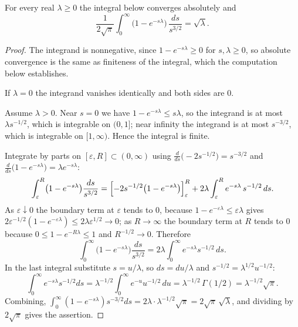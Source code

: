 \begin{lemma}
For every real $\lambda \geq 0$ the integral below converges absolutely and
\[
  \frac{1}{2\sqrt{\pi}} \int_0^\infty \bigl(1 - e^{-s\lambda}\bigr)
      \, \frac{ds}{s^{3/2}}
    = \sqrt{\lambda} .
\]
\end{lemma}
\begin{proof}
The integrand is nonnegative, since $1 - e^{-s\lambda} \geq 0$ for
$s, \lambda \geq 0$, so absolute convergence is the same as finiteness of the
integral, which the computation below establishes.

If $\lambda = 0$ the integrand vanishes identically and both sides are $0$.

Assume $\lambda > 0$.  Near $s = 0$ we have $1 - e^{-s\lambda} \leq s\lambda$, so
the integrand is at most $\lambda s^{-1/2}$, which is integrable on $(0,1]$; near
infinity the integrand is at most $s^{-3/2}$, which is integrable on
$[1,\infty)$.  Hence the integral is finite.

Integrate by parts on $[\varepsilon, R] \subset (0,\infty)$ using
$\frac{d}{ds}\bigl(-2 s^{-1/2}\bigr) = s^{-3/2}$ and
$\frac{d}{ds}\bigl(1-e^{-s\lambda}\bigr) = \lambda e^{-s\lambda}$:
\[
  \int_\varepsilon^R \bigl(1-e^{-s\lambda}\bigr)\frac{ds}{s^{3/2}}
   = \Bigl[-2s^{-1/2}\bigl(1-e^{-s\lambda}\bigr)\Bigr]_\varepsilon^R
     + 2\lambda\int_\varepsilon^R e^{-s\lambda}\, s^{-1/2}\, ds .
\]
As $\varepsilon \downarrow 0$ the boundary term at $\varepsilon$ tends to $0$,
because $1 - e^{-\varepsilon\lambda} \leq \varepsilon\lambda$ gives
$2\varepsilon^{-1/2}(1-e^{-\varepsilon\lambda}) \leq 2\lambda\varepsilon^{1/2} \to 0$;
as $R \to \infty$ the boundary term at $R$ tends to $0$ because
$0 \leq 1 - e^{-R\lambda} \leq 1$ and $R^{-1/2}\to0$.  Therefore
\[
  \int_0^\infty \bigl(1-e^{-s\lambda}\bigr)\frac{ds}{s^{3/2}}
    = 2\lambda \int_0^\infty e^{-s\lambda} s^{-1/2}\, ds .
\]
In the last integral substitute $s = u/\lambda$, so $ds = du/\lambda$ and
$s^{-1/2} = \lambda^{1/2}u^{-1/2}$:
\[
  \int_0^\infty e^{-s\lambda}s^{-1/2}ds
    = \lambda^{-1/2}\int_0^\infty e^{-u}u^{-1/2}\,du
    = \lambda^{-1/2}\,\Gamma(1/2)
    = \lambda^{-1/2}\sqrt{\pi}.
\]
Combining,
$\int_0^\infty(1-e^{-s\lambda})s^{-3/2}ds = 2\lambda\cdot\lambda^{-1/2}\sqrt\pi
= 2\sqrt\pi\,\sqrt\lambda$, and dividing by $2\sqrt\pi$ gives the assertion.
\end{proof}
